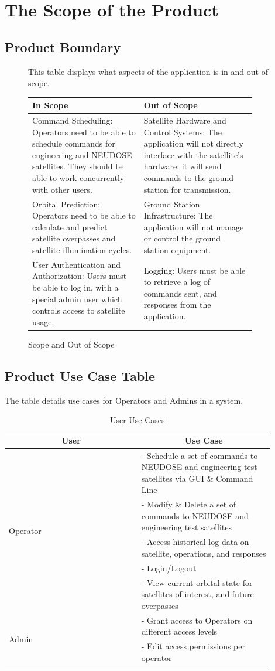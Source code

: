 \documentclass[12pt]{article}
\begin{document}
\section{The Scope of the Product}
\subsection{Product Boundary}
\begin{figure}[H]
This table displays what aspects of the application is in and out of scope. 
\centering
\caption{Scope and Out of Scope}
\begin{tabular}{|p{0.45\linewidth}|p{0.45\linewidth}|}
\hline
\textbf{In Scope} & \textbf{Out of Scope} \\
\hline
Command Scheduling: Operators need to be able to schedule commands for engineering and NEUDOSE satellites. They should be able to work concurrently with other users. & Satellite Hardware and Control Systems: The application will not directly interface with the satellite’s hardware; it will send commands to the ground station for transmission. \\
\hline
Orbital Prediction: Operators need to be able to calculate and predict satellite overpasses and satellite illumination cycles. & Ground Station Infrastructure: The application will not manage or control the ground station equipment. \\
\hline
User Authentication and Authorization: Users must be able to log in, with a special admin user which controls access to satellite usage. & Logging: Users must be able to retrieve a log of commands sent, and responses from the application. \\
\hline
\end{tabular}
\end{figure}
\subsection{Product Use Case Table}

\begin{table}[H]
\centering
 The table details use cases for Operators and Admins in a system.

\caption{User Use Cases}
\begin{tabular}{|p{0.45\linewidth}|p{0.45\linewidth}|}
\hline
\multicolumn{1}{|c|}{User} & \multicolumn{1}{c|}{Use Case} \\
\hline
\multirow{5}{*}{Operator} & - Schedule a set of commands to NEUDOSE and engineering test satellites via GUI \& Command Line \\
& - Modify \& Delete a set of commands to NEUDOSE and engineering test satellites \\
& - Access historical log data on satellite, operations, and responses \\
& - Login/Logout \\
& - View current orbital state for satellites of interest, and future overpasses \\
\hline
\multirow{2}{*}{Admin} & - Grant access to Operators on different access levels \\
& - Edit access permissions per operator \\
\hline
\end{tabular}
\end{table}
\end{document}
